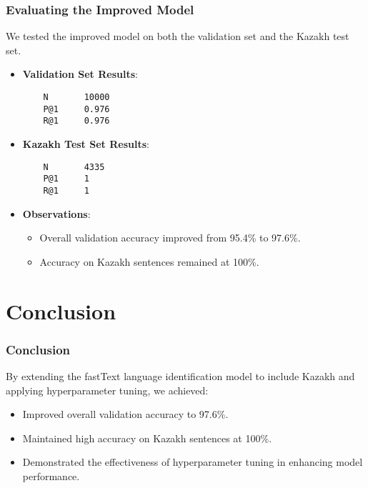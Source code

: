 \documentclass{beamer}
\begin{document}
\begin{frame}[fragile]
    \frametitle{Evaluating the Improved Model}
    We tested the improved model on both the validation set and the Kazakh test set.
    \begin{itemize}
        \item \textbf{Validation Set Results}:
        \begin{lstlisting}
    N       10000
    P@1     0.976
    R@1     0.976
        \end{lstlisting}
        \item \textbf{Kazakh Test Set Results}:
        \begin{lstlisting}
    N       4335
    P@1     1
    R@1     1
        \end{lstlisting}
        \item \textbf{Observations}:
        \begin{itemize}
            \item Overall validation accuracy improved from 95.4\% to 97.6\%.
            \item Accuracy on Kazakh sentences remained at 100\%.
        \end{itemize}
    \end{itemize}
\end{frame}

\section{Conclusion}

\begin{frame}
    \frametitle{Conclusion}
    By extending the fastText language identification model to include Kazakh and applying hyperparameter tuning, we achieved:
    \begin{itemize}
        \item Improved overall validation accuracy to 97.6\%.
        \item Maintained high accuracy on Kazakh sentences at 100\%.
        \item Demonstrated the effectiveness of hyperparameter tuning in enhancing model performance.
    \end{itemize}
\end{frame}
\end{document}
